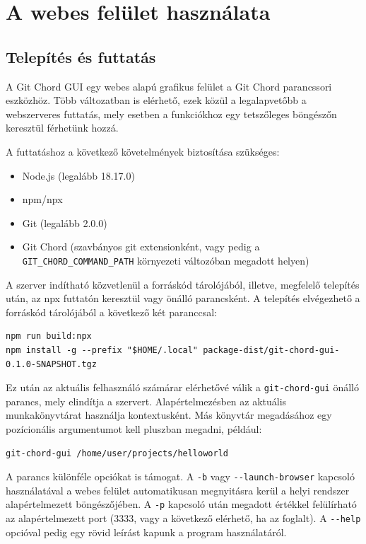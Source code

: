 \documentclass[
]{elteikthesis}[2025/03/25]
\begin{document}
\section{A webes felület használata}

\subsection{Telepítés és futtatás}

A Git Chord GUI egy webes alapú grafikus felület a Git Chord parancssori eszközhöz.
Több változatban is elérhető, ezek közül a legalapvetőbb a webszerveres futtatás,
mely esetben a funkciókhoz egy tetszőleges böngészőn keresztül férhetünk hozzá.

A futtatáshoz a következő követelmények biztosítása szükséges:

\begin{itemize}
    \item Node.js (legalább 18.17.0)
    \item npm/npx
    \item Git (legalább 2.0.0)
    \item Git Chord (szavbányos git extensionként, vagy pedig a \verb|GIT_CHORD_COMMAND_PATH| környezeti változóban megadott helyen)
\end{itemize}

A szerver indítható közvetlenül a forráskód tárolójából,
illetve, megfelelő telepítés után, az npx futtatón keresztül vagy önálló parancsként.
A telepítés elvégezhető a forráskód tárolójából a következő két paranccsal:

\begin{verbatim}
npm run build:npx
npm install -g --prefix "$HOME/.local" package-dist/git-chord-gui-0.1.0-SNAPSHOT.tgz
\end{verbatim}

Ez után az aktuális felhasználó számárar elérhetővé válik
a \verb|git-chord-gui| önálló parancs,
mely elindítja a szervert.
Alapértelmezésben az aktuális munkakönyvtárat használja kontextusként.
Más könyvtár megadásához egy pozícionális argumentumot kell pluszban megadni, például:

\begin{verbatim}
git-chord-gui /home/user/projects/helloworld
\end{verbatim}

A parancs különféle opciókat is támogat.
A \verb|-b| vagy \verb|--launch-browser| kapcsoló használatával a webes felület
automatikusan megnyitásra kerül a helyi rendszer alapértelmezett böngészőjében.
A \verb|-p| kapcsoló után megadott értékkel felülírható az alapértelmezett port
(3333, vagy a következő elérhető, ha az foglalt).
A \verb|--help| opcióval pedig egy rövid leírást kapunk a program használatáról.
\end{document}
